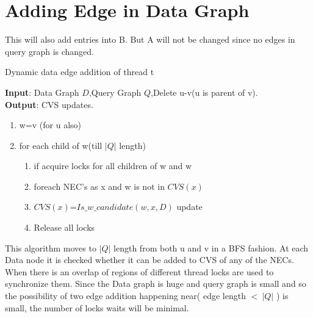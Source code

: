 \section{Adding Edge in Data Graph}
 \label{sec:ad}
	\hspace{10mm} This will also add entries into B. But A will not be changed since no edges in query graph is changed. 
	\begin{algorithm}[H]
\caption{Dynamic data edge addition of thread t}
\textbf{Input}: Data Graph $D$,Query Graph $Q$,Delete u-v(u is parent of v).\\
\textbf{Output}: CVS updates.\\
\begin{algorithmic}
 \item \begin{enumerate}
 \item w=v (for u also)
\item for each child of w(till $|Q|$ length)
\begin{enumerate}
\item if acquire locks for all children of w and w 
\item foreach NEC's as x and w is not in $CVS(x)$
\item \hspace{10mm}$CVS(x)$=$Is\_w\_candidate(w,x,D)$ update
\item Release all locks
\end{enumerate}
\end{enumerate}
\end{algorithmic}
\label{alg:adddataedge}
\end{algorithm}
\hspace{10mm} This algorithm moves to  $|Q|$ length from both u and v in a BFS fashion. At each Data node it is checked whether it can be added to CVS of any of the NECs. When there is an overlap of regions of different thread locks are used to synchronize them. Since the Data graph is huge and  query graph is small and so the possibility of two edge addition happening near( edge length  $< ~|Q|$ ) is small, the number of locks waits will be minimal.
